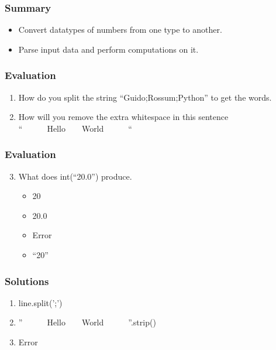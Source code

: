 \documentclass[17pt]{beamer}
\begin{document}
\begin{frame}
\frametitle{Summary}
\label{sec-9.2}
\begin{itemize}
\item Convert datatypes of numbers from one type to another.\pause
\item Parse input data and perform computations on it.
\end{itemize}
\end{frame}

\begin{frame}
\frametitle{Evaluation}
\label{sec-10.1}

\begin{enumerate}
\item How do you split the string ``Guido;Rossum;Python'' to get the words.\pause
\item How will you remove the extra whitespace in this sentence\\
     ``~~~~~~Hello~~~~World~~~~~~``
\end{enumerate}
\end{frame}

\begin{frame}
\frametitle{Evaluation}
\label{sec-10.2}
\begin{enumerate}    
\setcounter{enumi}{2}
\item What does int(``20.0'') produce.\pause
\begin{itemize}
\item 20
\item 20.0
\item Error
\item ``20''
\end{itemize}
\end{enumerate}
\end{frame}

\begin{frame}
\frametitle{Solutions}
\label{sec-11}


\begin{enumerate}
\item line.split(';')\pause
\item ''~~~~~~Hello~~~~World~~~~~~''.strip()\pause
\item Error
\end{enumerate}
\end{frame}
\end{document}
